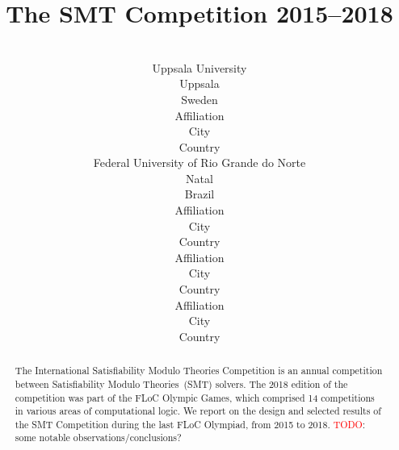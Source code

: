 \documentclass[twoside,11pt]{article}
\newcommand{\TODO}[0]{\textcolor{red}{TODO}}
\begin{document}
\title{The SMT Competition 2015--2018}

\author{%
   \\
  \addr Uppsala University \\
  Uppsala \\
  Sweden
  \AND
   \\
  \addr Affiliation \\
  City \\
  Country
  \AND
   \\
  \addr Federal University of Rio Grande do Norte \\
  Natal \\
  Brazil
  \AND
   \\
  \addr Affiliation \\
  City \\
  Country
  \AND
   \\
  \addr Affiliation \\
  City \\
  Country
  \AND
   \\
  \addr Affiliation \\
  City \\
  Country}

\maketitle


\begin{abstract}
  The International Satisfiability Modulo Theories Competition is an
  annual competition between Satisfiability Modulo Theories~(SMT)
  solvers.  The 2018 edition of the competition was part of the FLoC
  Olympic Games, which comprised 14 competitions in various areas of
  computational logic.  We report on the design and selected results
  of the SMT Competition during the last FLoC Olympiad, from 2015 to
  2018. \TODO: some notable observations/conclusions?
\end{abstract}
\end{document}
